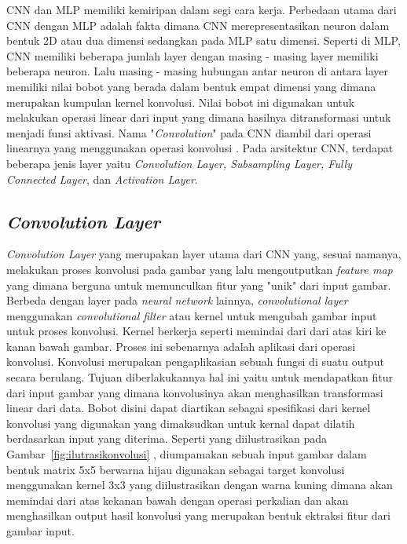 \par CNN dan MLP memiliki kemiripan dalam segi cara kerja. Perbedaan utama dari CNN dengan MLP adalah fakta
dimana CNN merepresentasikan neuron dalam bentuk 2D atau dua dimensi sedangkan pada MLP satu dimensi.
Seperti di MLP, CNN memiliki beberapa jumlah layer dengan masing - masing layer memiliki beberapa neuron.
Lalu masing - masing hubungan antar neuron di antara layer memiliki nilai bobot yang berada dalam bentuk empat dimensi
yang dimana merupakan kumpulan kernel konvolusi. Nilai bobot ini digunakan untuk melakukan operasi linear 
dari input yang dimana hasilnya ditransformasi untuk menjadi funsi aktivasi. Nama "\emph{Convolution}" pada 
CNN diambil dari operasi linearnya yang menggunakan operasi konvolusi \cite{putra2016klasifikasi}.
Pada arsitektur CNN, terdapat beberapa jenis layer yaitu \emph{Convolution Layer, Subsampling Layer, 
Fully Connected Layer}, dan \emph{Activation Layer}.

\subsection{\emph{Convolution Layer}}
\label{subsec:convolutionlayer}

\par \emph{Convolution Layer} yang merupakan layer utama dari CNN yang, sesuai namanya, melakukan proses konvolusi pada gambar 
yang lalu mengoutputkan \emph{feature map} yang dimana berguna untuk memunculkan fitur yang "unik" dari input gambar. Berbeda dengan layer pada
\emph{neural network} lainnya, \emph{convolutional layer} menggunakan \emph{convolutional filter} atau kernel untuk mengubah gambar input untuk proses konvolusi.
Kernel berkerja seperti memindai dari dari atas kiri ke kanan bawah gambar. Proses ini sebenarnya adalah aplikasi 
dari operasi konvolusi. Konvolusi merupakan pengaplikasian sebuah fungsi di suatu output secara berulang. Tujuan
diberlakukannya hal ini yaitu untuk mendapatkan fitur dari input gambar yang dimana konvolusinya akan menghasilkan
transformasi linear dari data. Bobot disini dapat diartikan sebagai spesifikasi dari kernel konvolusi yang digunakan yang
dimaksudkan untuk kernal dapat dilatih berdasarkan input yang diterima. Seperti yang diilustrasikan pada Gambar~\ref{fig:ilutrasikonvolusi} , diumpamakan sebuah
input gambar dalam bentuk matrix 5x5 berwarna hijau digunakan sebagai target konvolusi menggunakan kernel 3x3 yang diilustrasikan dengan
warna kuning dimana akan memindai dari atas kekanan bawah dengan operasi perkalian dan akan menghasilkan output hasil konvolusi yang
merupakan bentuk ektraksi fitur dari gambar input.

